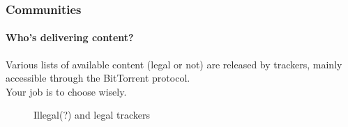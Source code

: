     \begin{frame}
      \frametitle{Communities}
      \framesubtitle{Who's delivering content?}
      Various lists of available content (legal or not) are released by trackers, mainly accessible through the BitTorrent protocol.\\
      Your job is to choose wisely.
      \begin{figure}
        \hfill
        \hfill
        \hfill
        \caption{Illegal(?) and legal trackers}
      \end{figure}
    \end{frame}
